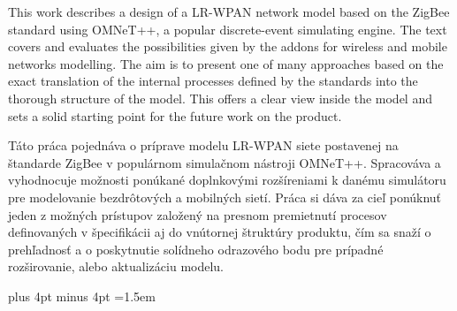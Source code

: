 \documentclass[12pt,twoside,a4paper]{book}   %
\begin{document}



 
\abstractpage

This work describes a design of a LR-WPAN network model based on the ZigBee standard using OMNeT++, a popular discrete-event simulating engine. The text covers and evaluates the possibilities given by the addons for wireless and mobile networks modelling. The aim is to present one of many approaches based on the exact translation of the internal processes defined by the standards into the thorough structure of the model. This offers a clear view inside the model and sets a solid starting point for the future work on the product.


\vspace{8ex}

\noindent
Táto práca pojednáva o príprave modelu LR-WPAN siete postavenej na štandarde ZigBee v populárnom simulačnom nástroji OMNeT++. Spracováva a vyhodnocuje možnosti ponúkané doplnkovými rozšíreniami k danému simulátoru pre modelovanie bezdrôtových a mobilných sietí. Práca si dáva za cieľ ponúknuť jeden z možných prístupov založený na presnom premietnutí procesov definovaných v špecifikácii aj do vnútornej štruktúry produktu, čím sa snaží o prehľadnosť a o poskytnutie solídneho odrazového bodu pre prípadné rozširovanie, alebo aktualizáciu modelu.

\noindent


\tableofcontents



\listoffigures



\listoftables



\mainbodystarts
\parskip=5pt plus 4pt minus 4pt
\parindent=1.5em
\end{document}
